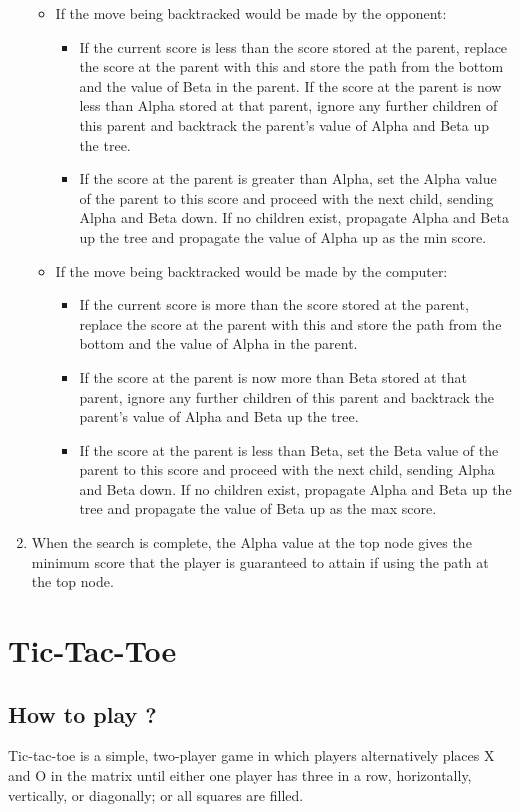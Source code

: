 \documentclass[11pt]{article}
\begin{document}
\begin{enumerate}
\begin{itemize}
        \item If the move being backtracked would be made by the opponent:
        \begin{itemize}
            \item If the current score is less than the score stored at the parent, replace the score at the parent with this and store the path from the bottom and the value of Beta in the parent. If the score at the parent is now less than Alpha stored at that parent, ignore any further children of this parent and backtrack the parent's value of Alpha and Beta up the tree.
            \item If the score at the parent is greater than Alpha, set the Alpha value of the parent to this score and proceed with the next child, sending Alpha and Beta down. If no children exist, propagate Alpha and Beta up the tree and propagate the value of Alpha up as the min score.
        \end{itemize}
        \item If the move being backtracked would be made by the computer:
        \begin{itemize}
            \item If the current score is more than the score stored at the parent, replace the score at the parent with this and store the path from the bottom and the value of Alpha in the parent.
            \item If the score at the parent is now more than Beta stored at that parent, ignore any further children of this parent and backtrack the parent's value of Alpha and Beta up the tree.
            \item If the score at the parent is less than Beta, set the Beta value of the parent to this score and proceed with the next child, sending Alpha and Beta down. If no children exist, propagate Alpha and Beta up the tree and propagate the value of Beta up as the max score.
        \end{itemize}
    \end{itemize}
    \item When the search is complete, the Alpha value at the top node gives the minimum score that the player is guaranteed to attain if using the path at the top node.
\end{enumerate}

\pagebreak
\section{Tic-Tac-Toe}
\subsection{How to play ?}
Tic-tac-toe is a simple, two-player game in which players alternatively places X and O in the matrix until either one player has three in a row, horizontally, vertically, or diagonally; or all squares are filled.
\end{document}
